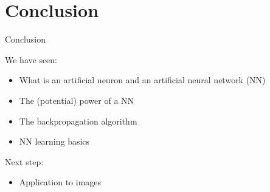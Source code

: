 \documentclass[xcolor=pdftex,dvipsnames,table,mathserif,aspectratio=169]{beamer}
\begin{document}







\section{Conclusion}


\begin{frame}{Conclusion}

  We have seen:
  \begin{itemize}
  \item What is an artificial neuron and an artificial neural network (NN)
  \item The (potential) power of a NN
  \item The backpropagation algorithm
  \item NN learning basics
  \end{itemize}

  Next step:
  \begin{itemize}
  \item Application to images
  \end{itemize}


\end{frame}
\end{document}
